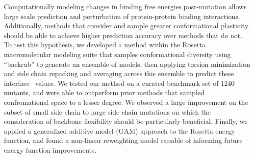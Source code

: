 Computationally modeling changes in binding free energies post-mutation allows large scale prediction and perturbation of protein-protein binding interactions.
Additionally, methods that consider and sample greater conformational plasticity should be able to achieve higher prediction accuracy over methods that do not.
To test this hypothesis, we developed a method within the Rosetta macromolecular modeling suite that samples conformational diversity using ``backrub'' to generate an ensemble of models, then applying torsion minimization and side chain repacking and averaging across this ensemble to predict these interface \ddg\ values.
We tested our method on a curated benchmark set of 1240 mutants, and were able to outperform prior methods that sampled confromational space to a lesser degree.
We observed a large improvement on the subset of small side chain to large side chain mutations on which the consideration of backbone flexibility should be particularly beneficial.
Finally, we applied a generalized additive model (GAM) approach to the Rosetta energy function, and found a non-linear reweighting model capable of informing future energy function improvements.
